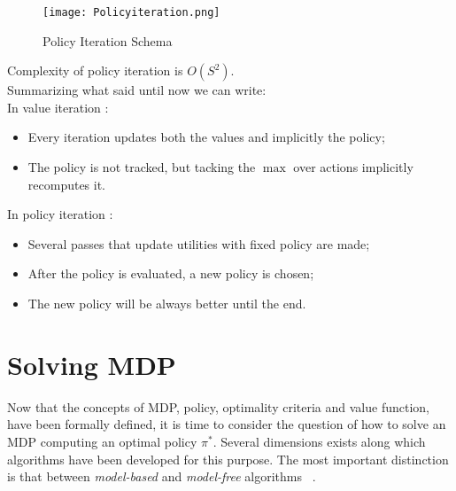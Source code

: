 \begin{figure}[h!]
	\centering
	\texttt{[image: Policyiteration.png]}
	\caption{Policy Iteration Schema}
	\label{fig:PolicyIteration}
\end{figure}

Complexity of policy iteration is $O(S^2)$. \\

Summarizing what said until now we can write: \\ 

In value iteration :

\begin{itemize}
	\item Every iteration updates both the values and implicitly the policy;
	\item The policy is not tracked, but tacking the $\max$ over actions implicitly recomputes it.
\end{itemize}

In policy iteration :

\begin{itemize}
	\item Several passes that update utilities with fixed policy are made;
	\item After the policy is evaluated, a new policy is chosen;
	\item The new policy will be always better until the end.
\end{itemize}

\section{Solving MDP}
Now that the concepts of MDP, policy, optimality criteria and value function, have been formally defined, it is time to consider the question of how to solve an MDP computing an optimal policy $\pi^*$. Several dimensions exists along which algorithms have been developed for this purpose. The most important distinction is that between \textit{model-based} and \textit{model-free} algorithms ~\cite{wiering2012reinforcement}.

